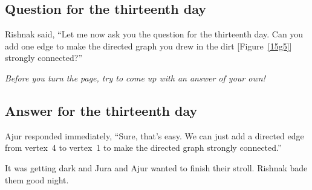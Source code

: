 \subsection*{Question for the thirteenth day}
Rishnak said, ``Let me now ask you the question for the thirteenth day. Can you add one edge to make the directed graph you drew in the dirt [Figure~\ref{15g5}] strongly connected?''

\textit{Before you turn the page, try to come up with an answer of your own!}

\newpage
\subsection*{Answer for the thirteenth day}
Ajur responded immediately, ``Sure, that's easy. We can just add a directed edge from vertex~4 to vertex~1 to make the directed graph strongly connected.''

It was getting dark and Jura and Ajur wanted to finish their stroll. Rishnak bade them good night.
